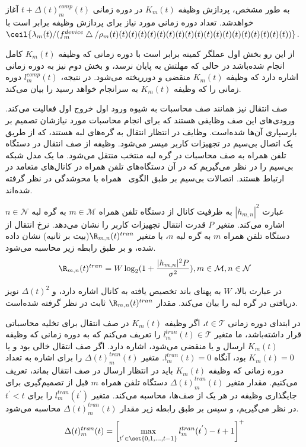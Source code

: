 به طور مشخص، پردازش وظیفه $K_m(t)$ در دوره زمانی $t + \Delta(t)_m^{comp}(t)$ آغاز خواهدشد. تعداد دوره زمانی مورد نیاز برای پردازش وظیفه برابر است با $\ceil{\lambda_m(t)/(f_m^{device}\bigtriangleup/ \rho_m(t)(t)(t)(t)(t)(t)(t)(t)(t)(t)(t)(t)(t)(t)(t)(t)(t)(t)(t))}$. 

از این رو بخش اول عملگر کمینه برابر است با دوره زمانی که وظیفه $K_m(t)$ کامل انجام شده‌باشد در حالی که مهلتش به پایان نرسد، و بخش دوم نیز به دوره زمانی اشاره دارد که وظیفه $K_m(t)$ منقضی و دورریخته می‌شود. در نتیجه، $l_m^{comp}(t)$ دوره زمانی را که وظیفه $K_m(t)$ به سرانجام خواهد رسید را بیان می‌کند. 




صف انتقال نیز همانند صف محاسبات به شیوه ورود اول خروج اول فعالیت می‌کند. ورودی‌های این صف وظایفی هستند که برای انجام محاسبات مورد نیازشان تصمیم بر بارسپاری آن‌ها شده‌است. وظایف در انتظار انتقال به گره‌های لبه هستند، که از طریق یک اتصال بی‌سیم در تجهیزات کاربر میسر می‌شود. وظیفه از صف انتقال در دستگاه تلفن همراه به صف محاسبات در گره لبه منتخب منتقل می‌شود. ما یک مدل شبکه بی‌سیم را در نظر می‌گیریم که در آن دستگاه‌های تلفن همراه در کانال‌های متعامد در ارتباط هستند. اتصالات بی‌سیم بر طبق الگوی~\cite{mao2017stochastic} همراه با محوشدگی در نظر گرفته شده‌اند.

عبارت $|h_{m,n}|^2$ به ظرفیت کانال از دستگاه تلفن همراه $m \in \mathcal{M}$ به گره لبه $n \in \mathcal{N}$ اشاره می‌کند. متغیر $P$ قدرت انتقال تجهیزات کاربر را نشان می‌دهد. نرخ انتقال از دستگاه تلفن همراه $m$ به گره لبه $n$، با متغیر $\R_{m,n}(t)^{tran}$(بیت بر ثانیه) نشان داده شده، و بر طبق رابطه زیر محاسبه می‌شود.
\begin{alignat}{2}
	\R_{m,n}(t)^{tran} = W \log_2(1 + {|h_{m,n}|^2 P \over \sigma^2}) , m \in \mathcal{M}, n \in \mathcal{N}
	\label{4}  
\end{alignat}


در عبارت بالا، $W$ به پهنای باند تخصیص یافته به کانال اشاره دارد، و $\Delta(t)^2$ نویز دریافتی در گره لبه را بیان می‌کند. مقدار $\R_{m,n}(t)^{tran}$ ثابت در نظر گرفته شده‌است. 

در ابتدای دوره زمانی $t \in \mathcal{T}$، اگر وظیفه $K_m(t)$ در صف انتقال برای تخلیه محاسباتی قرار داشته‌باشد، ما متغیر $l_m^{tran}(t) \in \mathcal{T}$ را تعریف می‌کنم که به دوره زمانی که وظیفه $K_m(t)$ ارسال و یا منقضی می‌شود، اشاره دارد. اگر صف انتقال خالی بود و یا $K_m(t)=0$ بود، آنگاه $l_m^{tran}(t) = 0$. 
متغیر $\Delta(t)_m^{tran}(t)$ را برای اشاره به تعداد دوره زمانی که وظیفه $K_m(t)$ باید در انتظار ارسال در صف انتقال بماند، تعریف می‌کنیم. مقدار متغیر $\Delta(t)_m^{tran}(t)$ دستگاه تلفن همراه $m$ قبل از تصمیم‌گیری برای جایگذاری وظیفه در هر یک از صف‌ها، محاسبه می‌کند. متغیر $l_m^{tran}(t^{'})$ را برای $t^{'} < t$ در نظر می‌گیریم، و سپس بر طبق رابطه زیر مقدار $\Delta(t)_m^{tran}(t)$ محاسبه می‌شود. 
\begin{alignat}{2}
	\Delta(t)_m^{tran}(t) = \left[ \max\limits_{t^{'} \in \set{0,1,\ldots,t-1}} l_m^{tran}(t^{'})-t+1\right]^+
	\label{5}  
\end{alignat}



